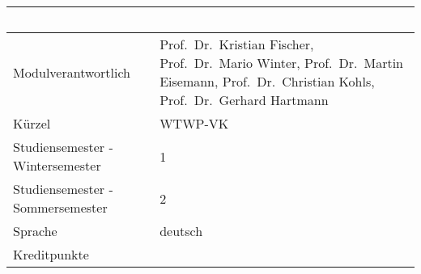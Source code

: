 \begin{longtable}[]{@{}ll@{}}
\toprule
\begin{minipage}[b]{0.12\columnwidth}\raggedright\strut
~\strut
\end{minipage} & \begin{minipage}[b]{0.12\columnwidth}\raggedright\strut
~\strut
\end{minipage}\tabularnewline
\midrule
\endhead
\begin{minipage}[t]{0.12\columnwidth}\raggedright\strut
Modulverantwortlich\strut
\end{minipage} & \begin{minipage}[t]{0.12\columnwidth}\raggedright\strut
Prof.~Dr.~Kristian Fischer, Prof.~Dr.~Mario Winter, Prof.~Dr.~Martin
Eisemann, Prof.~Dr.~Christian Kohls, Prof.~Dr.~Gerhard Hartmann\strut
\end{minipage}\tabularnewline
\begin{minipage}[t]{0.12\columnwidth}\raggedright\strut
Kürzel\strut
\end{minipage} & \begin{minipage}[t]{0.12\columnwidth}\raggedright\strut
WTWP-VK\strut
\end{minipage}\tabularnewline
\begin{minipage}[t]{0.12\columnwidth}\raggedright\strut
Studiensemester - Wintersemester\strut
\end{minipage} & \begin{minipage}[t]{0.12\columnwidth}\raggedright\strut
1\strut
\end{minipage}\tabularnewline
\begin{minipage}[t]{0.12\columnwidth}\raggedright\strut
Studiensemester - Sommersemester\strut
\end{minipage} & \begin{minipage}[t]{0.12\columnwidth}\raggedright\strut
2\strut
\end{minipage}\tabularnewline
\begin{minipage}[t]{0.12\columnwidth}\raggedright\strut
Sprache\strut
\end{minipage} & \begin{minipage}[t]{0.12\columnwidth}\raggedright\strut
deutsch\strut
\end{minipage}\tabularnewline
\begin{minipage}[t]{0.12\columnwidth}\raggedright\strut
Kreditpunkte\strut
\end{minipage} & \begin{minipage}[t]{0.12\columnwidth}\raggedright\strut

\end{minipage}
\end{longtable}
